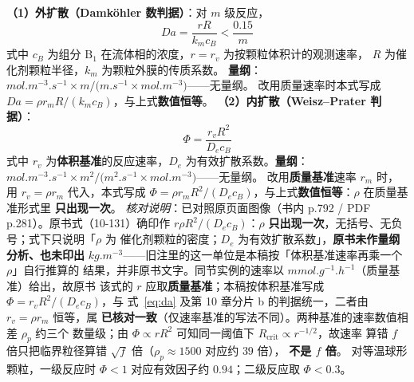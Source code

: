 \begin{principle}
\textbf{（1）外扩散（Damköhler 数判据）}：对 $m$ 级反应，
\begin{equation}
Da=\frac{rR}{k_m c_B}<\frac{0.15}{m}
\label{eq:da}
\end{equation}
式中 $c_B$ 为组分 $\mathrm{B_1}$ 在流体相的浓度，$r=r_v$ 为按颗粒体积计的观测速率，
$R$ 为催化剂颗粒半径，$k_m$ 为颗粒外膜的传质系数。
\textbf{量纲}：$\unit{mol.m^{-3}.s^{-1}}\times\unit{m}\big/
\big(\unit{m.s^{-1}}\times\unit{mol.m^{-3}}\big)$——无量纲。
改用质量速率时本式写成 $Da=\rho r_mR/(k_mc_B)$，与上式\textbf{数值恒等}。
\textbf{（2）内扩散（Weisz–Prater 判据）}：
\begin{equation}
\Phi=\frac{r_v R^{2}}{D_e c_B}
\label{eq:wp}
\end{equation}
式中 $r_v$ 为\textbf{体积基准}的反应速率，$D_e$ 为有效扩散系数。\textbf{量纲}：
$\unit{mol.m^{-3}.s^{-1}}\times\unit{m^2}\big/
\big(\unit{m^2.s^{-1}}\times\unit{mol.m^{-3}}\big)$——无量纲。
改用\textbf{质量基准}速率 $r_m$ 时，用 $r_v=\rho r_m$ 代入，本式写成
$\Phi=\rho r_mR^{2}/(D_ec_B)$，与上式\textbf{数值恒等}：$\rho$ 在质量基准形式里
\textbf{只出现一次}。
\emph{核对说明}：已对照原页面图像（书内 p.792 / PDF p.281）。原书式（10-131）确印作
$r\rho R^{2}/(D_ec_B)$：$\rho$ \textbf{只出现一次}，无括号、无负号；式下只说明「$\rho$ 为
催化剂颗粒的密度；$D_e$ 为有效扩散系数」，\textbf{原书未作量纲分析、也未印出}
$\unit{kg.m^{-3}}$——旧注里的这一单位是本稿按「体积基准速率再乘一个 $\rho$」自行推算的
结果，并非原书文字。同节实例的速率以 $\unit{mmol.g^{-1}.h^{-1}}$（质量基准）给出，故原书
该式的 $r$ 应取\textbf{质量基准}；本稿按体积基准写成 $\Phi=r_vR^{2}/(D_ec_B)$，与
式~\eqref{eq:da} 及第 10 章分片 b 的判据统一，二者由 $r_v=\rho r_m$ 恒等，属
\textbf{已核对一致}（仅速率基准的写法不同）。两种基准的速率数值相差 $\rho_p$ 约三个
数量级；由 $\Phi\propto rR^{2}$ 可知同一阈值下 $R_{\text{crit}}\propto r^{-1/2}$，故速率
算错 $f$ 倍只把临界粒径算错 $\sqrt{f}$ 倍（$\rho_p\approx1500$ 对应约 $39$ 倍），
\textbf{不是 $f$ 倍}。
对等温球形颗粒，一级反应时 $\Phi<1$ 对应有效因子约 $0.94$；二级反应取 $\Phi<0.3$。

\end{principle}

